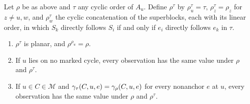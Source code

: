 \begin{lemma}\label{lem:eng4-superblock}\label{cor:eng4-fgb}
Let $\rho$ be as above and $\tau$ any cyclic order of $A_u$. Define
$\rho^\tau$ by $\rho^\tau_u=\tau$, $\rho^\tau_z=\rho_z$ for $z\ne u,w$, and
$\rho^\tau_w$ the cyclic concatenation of the superblocks, each with its
linear order, in which $S_k$ directly follows $S_i$ if and only if $e_i$
directly follows $e_k$ in $\tau$.
\begin{enumerate}[label=(\alph*),nosep]
\item $\rho^\tau$ is planar, and $\rho^{\rho_u}=\rho$.
\item If $u$ lies on no marked cycle, every observation has the same value
  under $\rho$ and $\rho^\tau$.
\item If $u\in C\in\mathcal M$ and $\gamma_\tau(C,u,e)=\gamma_\rho(C,u,e)$ for
  every nonanchor $e$ at $u$, every observation has the same value under
  $\rho$ and $\rho^\tau$.
\end{enumerate}
\end{lemma}


